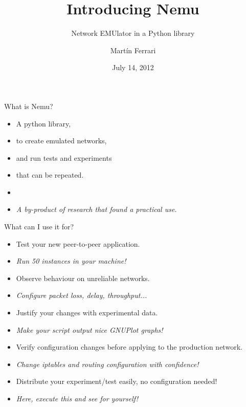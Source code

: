 \documentclass{beamer}
\title{Introducing Nemu}
\subtitle{Network EMUlator in a \hsout{box} Python library}
\author{Martín Ferrari}
\institute[DebConf 12]{\pgfuseimage{debian-logo-big}}
\date{July 14, 2012}
\begin{document}
\begin{frame}
  \titlepage
\end{frame}

\begin{frame}{What is Nemu?}
  \begin{itemize}
  \item A \alert{python} library,
  \item to create \alert{emulated networks},
  \item and run \alert{tests and experiments}
  \item that can be \alert{repeated}.
  \item[]{}
  \item[] \em{A by-product of research that found a practical use.}
  \end{itemize}
\end{frame}

\begin{frame}{What can I use it for?}
  \begin{itemize}
  \item Test your new peer-to-peer application.
  \item[] \small{\em{Run 50 instances in your machine!}}
  \vfill
  \item Observe behaviour on unreliable networks.
  \item[] \small{\em{Configure packet loss, delay, throughput...}}
  \vfill
  \item Justify your changes with experimental data.
  \item[] \small{\em{Make your script output nice GNUPlot graphs!}}
  \vfill
  \item Verify configuration changes before applying to the production network.
  \item[] \small{\em{Change iptables and routing configuration with
  confidence!}}
  \vfill
  \item Distribute your experiment/test easily, no configuration needed!
  \item[] \small{\em{Here, execute this and see for yourself!}}
  \end{itemize}
\end{frame}
\end{document}
